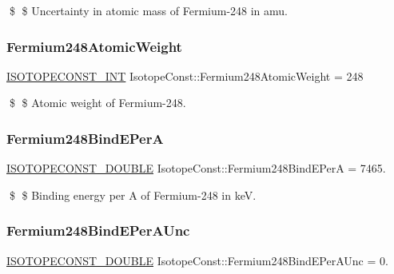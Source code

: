 \$ \$ Uncertainty in atomic mass of Fermium-\/248 in amu. \mbox{\label{group___isotope_const-_fermium-_fm248_gad2a3e0685b720415230ff526d9eacb53}} 
\subsubsection{\texorpdfstring{Fermium248\+Atomic\+Weight}{Fermium248AtomicWeight}}
{\footnotesize\ttfamily \mbox{\hyperlink{group___isotope_const-_macros_ga5f18360b3e99483a35c32d789e62621c}{I\+S\+O\+T\+O\+P\+E\+C\+O\+N\+S\+T\+\_\+\+I\+NT}} Isotope\+Const\+::\+Fermium248\+Atomic\+Weight = 248}

\$ \$ Atomic weight of Fermium-\/248. \mbox{\label{group___isotope_const-_fermium-_fm248_gae3cf5780ce51038513095e3a89afb11a}} 
\subsubsection{\texorpdfstring{Fermium248\+Bind\+E\+PerA}{Fermium248BindEPerA}}
{\footnotesize\ttfamily \mbox{\hyperlink{group___isotope_const-_macros_ga8f45a7272ce02c0b4c65c44636ed719a}{I\+S\+O\+T\+O\+P\+E\+C\+O\+N\+S\+T\+\_\+\+D\+O\+U\+B\+LE}} Isotope\+Const\+::\+Fermium248\+Bind\+E\+PerA = 7465.}

\$ \$ Binding energy per A of Fermium-\/248 in keV. \mbox{\label{group___isotope_const-_fermium-_fm248_ga8f63de05bafae6b7c7656ff1e07d51c1}} 
\subsubsection{\texorpdfstring{Fermium248\+Bind\+E\+Per\+A\+Unc}{Fermium248BindEPerAUnc}}
{\footnotesize\ttfamily \mbox{\hyperlink{group___isotope_const-_macros_ga8f45a7272ce02c0b4c65c44636ed719a}{I\+S\+O\+T\+O\+P\+E\+C\+O\+N\+S\+T\+\_\+\+D\+O\+U\+B\+LE}} Isotope\+Const\+::\+Fermium248\+Bind\+E\+Per\+A\+Unc = 0.}

